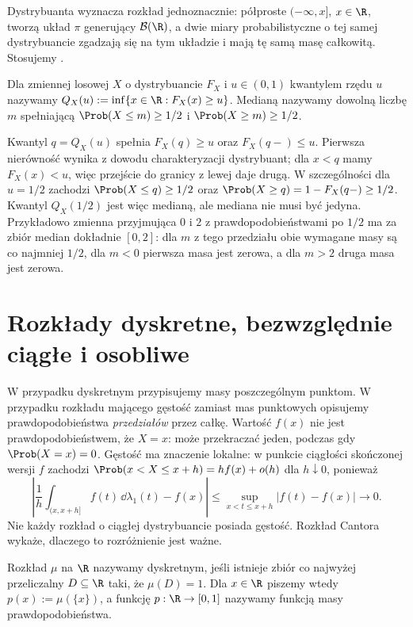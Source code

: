 Dystrybuanta wyznacza rozkład jednoznacznie: półproste
$(-\infty,x]$, $x\in\R$, tworzą układ $\pi$ generujący
$\mathcal B(\R)$, a dwie miary probabilistyczne o tej samej
dystrybuancie zgadzają się na tym układzie i mają tę samą
masę całkowitą. Stosujemy
.

\begin{definicja}
Dla zmiennej losowej $X$ o dystrybuancie $F_X$ i $u\in(0,1)$
kwantylem rzędu $u$ nazywamy
$Q_X(u):=\inf\{x\in\R:F_X(x)\geq u\}$.
Medianą nazywamy dowolną liczbę $m$ spełniającą
$\Prob(X\leq m)\geq1/2$ i $\Prob(X\geq m)\geq1/2$.
\end{definicja}

\begin{uwaga}
Kwantyl $q=Q_X(u)$ spełnia $F_X(q)\geq u$ oraz $F_X(q-)\leq u$.
Pierwsza nierówność wynika z dowodu charakteryzacji dystrybuant;
dla $x<q$ mamy $F_X(x)<u$, więc przejście do granicy z lewej
daje drugą. W szczególności dla $u=1/2$ zachodzi
$\Prob(X\leq q)\geq1/2$ oraz
$\Prob(X\geq q)=1-F_X(q-)\geq1/2$.
Kwantyl $Q_X(1/2)$ jest więc medianą, ale mediana nie musi być jedyna.
Przykładowo zmienna przyjmująca $0$ i $2$ z prawdopodobieństwami
po $1/2$ ma za zbiór median dokładnie $[0,2]$:
dla $m$ z tego przedziału obie wymagane masy są co najmniej
$1/2$, dla $m<0$ pierwsza masa jest zerowa, a dla $m>2$
druga masa jest zerowa.
\end{uwaga}

\section{Rozkłady dyskretne, bezwzględnie ciągłe i osobliwe}
W przypadku dyskretnym przypisujemy masy poszczególnym punktom.
W przypadku rozkładu mającego gęstość zamiast mas punktowych
opisujemy prawdopodobieństwa \emph{przedziałów} przez całkę.
Wartość $f(x)$ nie jest prawdopodobieństwem, że $X=x$:
może przekraczać jeden, podczas gdy $\Prob(X=x)=0$.
Gęstość ma znaczenie lokalne: w punkcie ciągłości skończonej
wersji $f$ zachodzi $\Prob(x<X\leq x+h)=hf(x)+o(h)$
dla $h\downarrow0$, ponieważ
\[
\left|\frac{1}{h}\int_{(x,x+h]}f(t)\,\dd\lambda_1(t)-f(x)\right|
\leq\sup_{x<t\leq x+h}|f(t)-f(x)|\longrightarrow0.
\]
Nie każdy rozkład o ciągłej dystrybuancie posiada gęstość.
Rozkład Cantora
wykaże, dlaczego to rozróżnienie jest ważne.

\begin{definicja}
Rozkład $\mu$ na $\R$ nazywamy dyskretnym, jeśli istnieje zbiór
co najwyżej przeliczalny $D\subseteq\R$ taki, że $\mu(D)=1$.
Dla $x\in\R$ piszemy wtedy $p(x):=\mu(\{x\})$, a funkcję
$p:\R\to[0,1]$ nazywamy funkcją masy prawdopodobieństwa.
\end{definicja}

